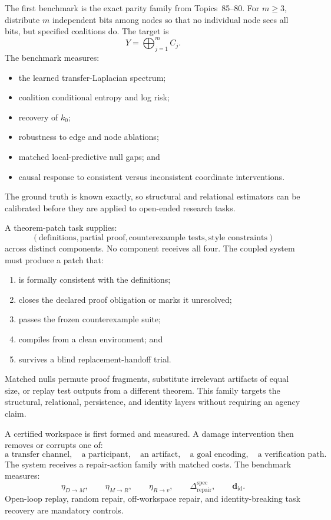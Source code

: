 The first benchmark is the exact parity family from Topics~85--80. For
\(m\geq3\), distribute \(m\) independent bits among nodes so that no individual
node sees all bits, but specified coalitions do. The target is
\[
Y=\bigoplus_{j=1}^m C_j.
\]
The benchmark measures:
\begin{itemize}
\item the learned transfer-Laplacian spectrum;
\item coalition conditional entropy and log risk;
\item recovery of \(k_0\);
\item robustness to edge and node ablations;
\item matched local-predictive null gaps; and
\item causal response to consistent versus inconsistent coordinate
 interventions.
\end{itemize}
The ground truth is known exactly, so structural and relational estimators can
be calibrated before they are applied to open-ended research tasks.


A theorem-patch task supplies:
\[
\left(
\text{definitions},
\text{partial proof},
\text{counterexample tests},
\text{style constraints}
\right)
\]
across distinct components. No component receives all four. The coupled
system must produce a patch that:
\begin{enumerate}
\item is formally consistent with the definitions;
\item closes the declared proof obligation or marks it unresolved;
\item passes the frozen counterexample suite;
\item compiles from a clean environment; and
\item survives a blind replacement-handoff trial.
\end{enumerate}
Matched nulls permute proof fragments, substitute irrelevant artifacts of equal
size, or replay test outputs from a different theorem. This family targets the
structural, relational, persistence, and identity layers without requiring an
agency claim.


A certified workspace is first formed and measured. A damage intervention then
removes or corrupts one of:
\[
\text{a transfer channel},
\quad
\text{a participant},
\quad
\text{an artifact},
\quad
\text{a goal encoding},
\quad
\text{a verification path}.
\]
The system receives a repair-action family with matched costs. The benchmark
measures:
\[
\eta_{D\to M},
\qquad
\eta_{M\to R},
\qquad
\eta_{R\to v},
\qquad
\Delta_{\mathrm{repair}}^{\mathrm{spec}},
\qquad
\mathbf d_{\mathrm{id}}.
\]
Open-loop replay, random repair, off-workspace repair, and identity-breaking
task recovery are mandatory controls.

